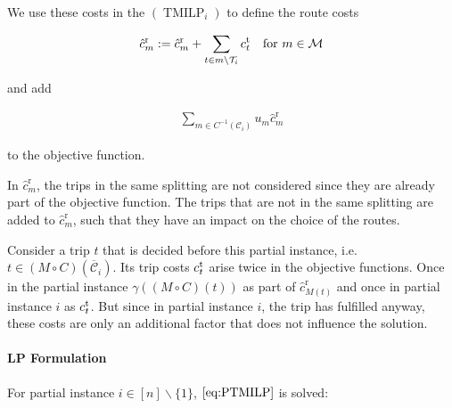 We use these costs in the $(\operatorname{TMILP}_i)$ to define the route costs

\begin{align}
	\hat{c}^{\operatorname{r}}_m := \hat{c}^{\operatorname{r}}_m + \sum_{t\in m\backslash\mathcal{T}_i}c^{\operatorname{t}}_t && \text{for } m\in\mathcal{M}
\end{align}

and add 

\begin{align*}
	\sum_{m\in C^{-1}\left(\mathcal{C}_i\right)} u_m \hat{c}^{\operatorname{r}}_m
\end{align*}

to the objective function.

In $\hat{c}^{\operatorname{r}}_m$, the trips in the same splitting are not considered since they are already part of the objective function. The trips that are not in the same splitting are added to $\hat{c}^{\operatorname{r}}_m$, such that they have an impact on the choice of the routes.

Consider a trip $t$ that is decided before this partial instance, i.e. $t\in(M\circ C)\left(\overline{\mathcal{C}}_i\right)$. Its trip costs $c^{\operatorname{t}}_t$ arise twice in the objective functions. Once in the partial instance $\gamma\left((M\circ C)(t)\right)$ as part of $\hat{c}^{\operatorname{r}}_{M(t)}$ and once in partial instance $i$ as $c^{\operatorname{t}}_t$. But since in partial instance $i$, the trip has fulfilled anyway, these costs are only an additional factor that does not influence the solution.

\paragraph{LP Formulation} \parfill

For partial instance $i\in[n]\backslash\{1\}$, $\eqref{eq:PTMILP}$ is solved:

\newpage
\pagestyle{empty}

